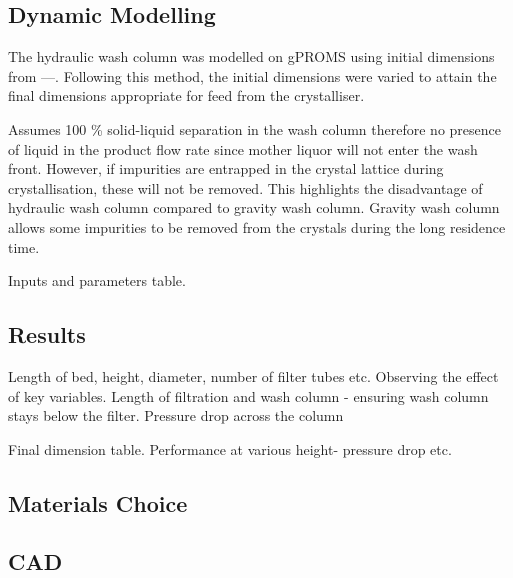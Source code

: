\subsection{Dynamic Modelling}
The hydraulic wash column was modelled on gPROMS using initial dimensions from ---. Following this method, the initial dimensions were varied to attain the final dimensions appropriate for feed from the crystalliser. 

Assumes 100 \% solid-liquid separation in the wash column therefore no presence of liquid in the product flow rate since mother liquor will not enter the wash front. However, if impurities are entrapped in the crystal lattice during crystallisation, these will not be removed. This highlights the disadvantage of hydraulic wash column compared to gravity wash column. Gravity wash column allows some impurities to be removed from the crystals during the long residence time. 

Inputs and parameters table. 

\subsection{Results}
Length of bed, height, diameter, number of filter tubes etc. Observing the effect of key variables. Length of filtration and wash column - ensuring wash column stays below the filter. Pressure drop across the column

Final dimension table. 
Performance at various height- pressure drop etc. 

\subsection{Materials Choice}

\subsection{CAD}

